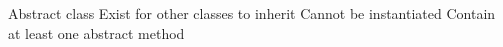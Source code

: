 Abstract class 
  Exist for other classes to inherit 
  Cannot be instantiated 
  Contain at least one abstract method 

